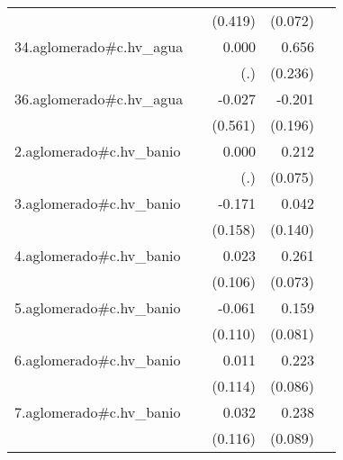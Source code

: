 {\begin{longtable}{l*{4}{D{.}{.}{-1}}}
            &                     &     (0.419)         &     (0.072)         &                     \\
\addlinespace
34.aglomerado#c.hv\_agua&                     &       0.000         &       0.656\sym{**} &                     \\
            &                     &         (.)         &     (0.236)         &                     \\
\addlinespace
36.aglomerado#c.hv\_agua&                     &      -0.027         &      -0.201         &                     \\
            &                     &     (0.561)         &     (0.196)         &                     \\
\addlinespace
2.aglomerado#c.hv\_banio&                     &       0.000         &       0.212\sym{**} &                     \\
            &                     &         (.)         &     (0.075)         &                     \\
\addlinespace
3.aglomerado#c.hv\_banio&                     &      -0.171         &       0.042         &                     \\
            &                     &     (0.158)         &     (0.140)         &                     \\
\addlinespace
4.aglomerado#c.hv\_banio&                     &       0.023         &       0.261\sym{***}&                     \\
            &                     &     (0.106)         &     (0.073)         &                     \\
\addlinespace
5.aglomerado#c.hv\_banio&                     &      -0.061         &       0.159\sym{*}  &                     \\
            &                     &     (0.110)         &     (0.081)         &                     \\
\addlinespace
6.aglomerado#c.hv\_banio&                     &       0.011         &       0.223\sym{**} &                     \\
            &                     &     (0.114)         &     (0.086)         &                     \\
\addlinespace
7.aglomerado#c.hv\_banio&                     &       0.032         &       0.238\sym{**} &                     \\
            &                     &     (0.116)         &     (0.089)         &                     \\

\end{longtable}}
